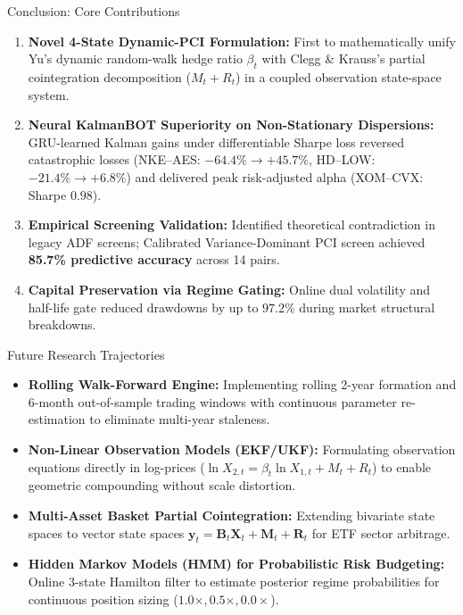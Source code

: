 \documentclass[10pt, aspectratio=169]{beamer}
\begin{document}
\begin{frame}{Conclusion: Core Contributions}
  \begin{enumerate}
    \item \textbf{Novel 4-State Dynamic-PCI Formulation:} First to mathematically unify Yu's dynamic random-walk hedge ratio $\beta_t$ with Clegg \& Krauss's partial cointegration decomposition ($M_t + R_t$) in a coupled observation state-space system.
    \item \textbf{Neural KalmanBOT Superiority on Non-Stationary Dispersions:} GRU-learned Kalman gains under differentiable Sharpe loss reversed catastrophic losses (NKE--AES: $-64.4\% \to +45.7\%$, HD--LOW: $-21.4\% \to +6.8\%$) and delivered peak risk-adjusted alpha (XOM--CVX: Sharpe $0.98$).
    \item \textbf{Empirical Screening Validation:} Identified theoretical contradiction in legacy ADF screens; Calibrated Variance-Dominant PCI screen achieved \textbf{85.7\% predictive accuracy} across 14 pairs.
    \item \textbf{Capital Preservation via Regime Gating:} Online dual volatility and half-life gate reduced drawdowns by up to $\mathbf{97.2\%}$ during market structural breakdowns.
  \end{enumerate}
\end{frame}

\begin{frame}{Future Research Trajectories}
  \begin{itemize}
    \item \textbf{Rolling Walk-Forward Engine:} Implementing rolling 2-year formation and 6-month out-of-sample trading windows with continuous parameter re-estimation to eliminate multi-year staleness.
    \item \textbf{Non-Linear Observation Models (EKF/UKF):} Formulating observation equations directly in log-prices ($\ln X_{2,t} = \beta_t \ln X_{1,t} + M_t + R_t$) to enable geometric compounding without scale distortion.
    \item \textbf{Multi-Asset Basket Partial Cointegration:} Extending bivariate state spaces to vector state spaces $\bm{y}_t = \bm{B}_t \bm{X}_t + \bm{M}_t + \bm{R}_t$ for ETF sector arbitrage.
    \item \textbf{Hidden Markov Models (HMM) for Probabilistic Risk Budgeting:} Online 3-state Hamilton filter to estimate posterior regime probabilities for continuous position sizing ($1.0\times, 0.5\times, 0.0\times$).
  \end{itemize}
\end{frame}
\end{document}
